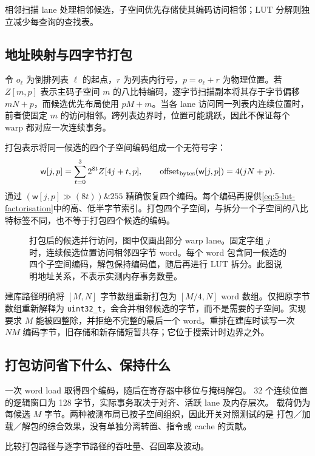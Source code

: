 相邻扫描 lane 处理相邻候选，子空间优先存储使其编码访问相邻；LUT 分解则独立减少每查询的查找表。

\subsection{地址映射与四字节打包}

令 $o_\ell$ 为倒排列表 $\ell$ 的起点，$r$ 为列表内行号，$p=o_\ell+r$ 为物理位置。若 $Z[m,p]$ 表示主码子空间 $m$ 的八比特编码，逐字节扫描副本将其存于字节偏移 $mN+p$，而候选优先布局使用 $pM+m$。当各 lane 访问同一列表内连续位置时，前者使固定 $m$ 的访问相邻。跨列表边界时，位置可能跳跃，因此不保证每个 warp 都对应一次连续事务。

打包表示将同一候选的四个子空间编码组成一个无符号字：
\begin{equation}
 \mathsf{w}[j,p]=\sum_{t=0}^{3}2^{8t}Z[4j+t,p],\qquad
 \operatorname{offset}_{\rm bytes}(\mathsf{w}[j,p])=4(jN+p).
 \label{eq:5-packed-layout}
\end{equation}
通过 $(\mathsf{w}[j,p]\gg(8t))\mathbin{\&}255$ 精确恢复四个编码。每个编码再提供\cref{eq:5-lut-factorisation}中的高、低半字节索引。打包四个子空间，与拆分一个子空间的八比特标签不同，也不等于打包四个候选的编码。

\begin{figure}[tbp]
\centering

\caption[打包后的候选并行访问]{打包后的候选并行访问，图中仅画出部分 warp lane。固定字组 $j$ 时，连续候选位置访问相邻四字节 word。每个 word 包含同一候选的四个子空间编码，解包保持编码值，随后再进行 LUT 拆分。此图说明地址关系，不表示实测内存事务数量。}
\label{fig:5-packed-access}
\end{figure}

建库路径明确将 $[M,N]$ 字节数组重新打包为 $[M/4,N]$ word 数组。仅把原字节数组重新解释为 \texttt{uint32\_t}，会合并相邻候选的字节，而不是需要的子空间。实现要求 $M$ 能被四整除，并拒绝不完整的最后一个 word。重排在建库时读写一次 $NM$ 编码字节，旧存储和新存储短暂共存；它位于搜索计时边界之外。

\subsection{打包访问省下什么、保持什么}

一次 word load 取得四个编码，随后在寄存器中移位与掩码解包。
32 个连续位置的逻辑窗口为 128 字节，实际事务取决于对齐、活跃 lane 及内存层次。
载荷仍为每候选 $M$ 字节。两种被测布局已按子空间组织，因此开关对照测试的是
打包／加载／解包的综合效果，没有单独分离转置、指令或 cache 的贡献。

比较打包路径与逐字节路径的吞吐量、召回率及波动。
